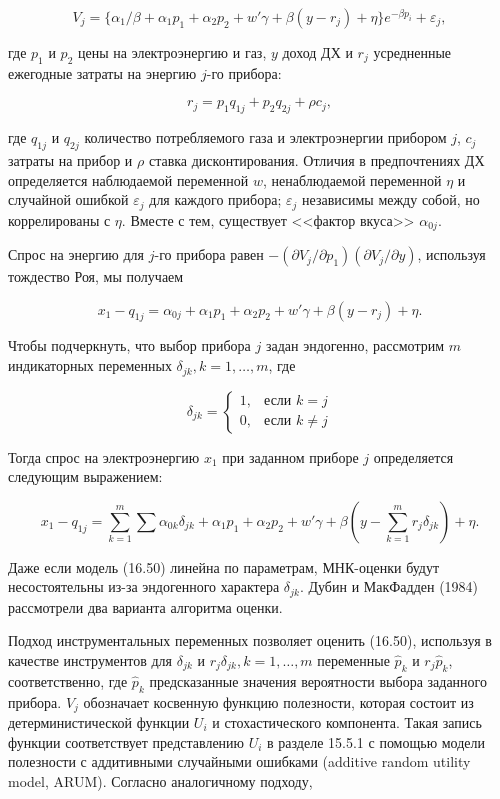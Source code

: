 \begin{equation}
V_j=\lbrace\alpha_1/\beta+\alpha_1{p_1}+\alpha_2{p_2}+w'\gamma+\beta(y-r_j)+\eta\rbrace{e}^{-{\beta}p_i}+\varepsilon_j,
\end{equation}

где $p_1$ и $p_2$ цены на электроэнергию и газ, $y$ доход ДХ и $r_j$ усредненные ежегодные затраты на энергию $j$-го прибора:

\[
r_j=p_1q_{1j}+p_2q_{2j}+\rho{c}_j,
\]

где $q_{1j}$ и $q_{2j}$ количество потребляемого газа и электроэнергии прибором $j$, $c_j$ затраты на прибор и $\rho$ ставка дисконтирования. Отличия в предпочтениях ДХ определяется наблюдаемой переменной $w$, ненаблюдаемой переменной $\eta$ и случайной ошибкой $\varepsilon_j$ для каждого прибора; $\varepsilon_j$ независимы между собой, но коррелированы с $\eta$. Вместе с тем, существует <<фактор вкуса>> $\alpha_{0j}$.


Спрос на энергию для $j$-го прибора равен $-(\partial{V_j}/\partial{p_1})(\partial{V_j}/\partial{y})$, используя тождество Роя, мы получаем


\[
x_1-q_{1j}=\alpha_{0j}+\alpha_{1}p_1+\alpha_2{p_2}+w'\gamma+\beta(y-r_j)+\eta.
\]

Чтобы подчеркнуть, что выбор прибора $j$ задан эндогенно, рассмотрим $m$ индикаторных переменных $\delta_{jk},k=1,\ldots ,m$, где

\[
\delta_{jk}=
	\begin{cases}
	1, & \text{если }k=j\\
	0, & \text{если }k{\neq}j
	\end{cases}
\]

Тогда спрос на электроэнергию $x_1$ при заданном приборе $j$  определяется следующим выражением:

\begin{equation}
x_1-q_{1j}=\sum_{k=1}^m 
\sum\alpha_{0k}\delta_{jk}+\alpha_{1}p_1+\alpha_{2}p_2+w'\gamma+\beta\left(y-\sum_{k=1}^{m}{r_j\delta_{jk}}\right)+\eta.
\end{equation}

Даже если модель (16.50) линейна по параметрам, МНК-оценки будут несостоятельны из-за эндогенного характера $\delta_{jk}$. Дубин и МакФадден (1984) рассмотрели два варианта алгоритма оценки.

Подход инструментальных переменных позволяет оценить (16.50), используя в качестве инструментов для $\delta_{jk}$ и $r_j\delta_{jk},k=1,\ldots ,m$ переменные $\hat{p}_k$ и $r_{j}\hat{p}_k$, соответственно, где $\hat{p}_k$ предсказанные значения вероятности выбора заданного прибора. $V_j$ обозначает косвенную функцию полезности, которая состоит из детерминистической функции $U_i$ и стохастического компонента. Такая запись функции соответствует представлению $U_i$ в разделе 15.5.1 с помощью модели полезности с аддитивными случайными ошибками (additive random utility model, ARUM). Согласно аналогичному подходу, 

